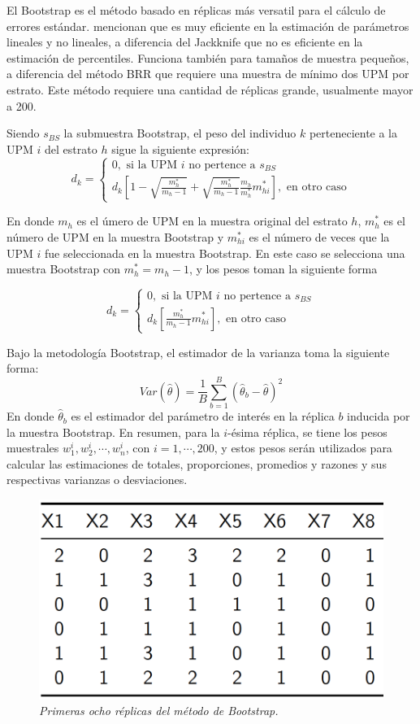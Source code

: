 \documentclass[
  10pt,
  spanish,
]{book}
\begin{document}
El Bootstrap es el método basado en réplicas más versatil para el cálculo de errores estándar. \citet{Valliant_Dever_2017} mencionan que es muy eficiente en la estimación de parámetros lineales y no lineales, a diferencia del Jackknife que no es eficiente en la estimación de percentiles. Funciona también para tamaños de muestra pequeños, a diferencia del método BRR que requiere una muestra de mínimo dos UPM por estrato. Este método requiere una cantidad de réplicas grande, usualmente mayor a 200.

Siendo \(s_{BS}\) la submuestra Bootstrap, el peso del individuo \(k\) perteneciente a la UPM \(i\) del estrato \(h\) sigue la siguiente expresión:
\[
d_{k} = 
\begin{cases}
0, \text{\ si la UPM $i$ no pertence a $s_{BS}$} \\
d_k\left[1 - \sqrt{\frac{m^*_h}{m_h-1}}+\sqrt{\frac{m^*_h}{m_h-1}}
\frac{m_h}{m^*_h}m^*_{hi}
\right], \text{\ en otro caso} 
\end{cases}
\]

En donde \(m_h\) es el úmero de UPM en la muestra original del estrato \(h\), \(m^*_h\) es el número de UPM en la muestra Bootstrap y \(m^*_{hi}\) es el número de veces que la UPM \(i\) fue seleccionada en la muestra Bootstrap. En este caso se selecciona una muestra Bootstrap con \(m^*_h = m_h - 1\), y los pesos toman la siguiente forma

\[
d_{k} = 
\begin{cases}
0, \text{\ si la UPM $i$ no pertence a $s_{BS}$} \\
d_k \left[\frac{m^*_h}{m_h-1} m^*_{hi}\right], \text{\ en otro caso} 
\end{cases}
\]

Bajo la metodología Bootstrap, el estimador de la varianza toma la siguiente forma:
\[
Var(\hat{\theta}) = \frac{1}{B}\sum_{b=1}^B(\hat{\theta}_b - \hat\theta )^2
\]
En donde \(\hat{\theta}_b\) es el estimador del parámetro de interés en la réplica \(b\) inducida por la muestra Bootstrap. En resumen, para la \(i\)-ésima réplica, se tiene los pesos muestrales \(w_1^i,w_2^i, \cdots, w_n^i\), con \(i=1,\cdots,200\), y estos pesos serán utilizados para calcular las estimaciones de totales, proporciones, promedios y razones y sus respectivas varianzas o desviaciones.

\begin{figure}
\centering
\includegraphics{Pics/23.png}
\caption{\emph{Primeras ocho réplicas del método de Bootstrap.}}
\end{figure}
\end{document}
